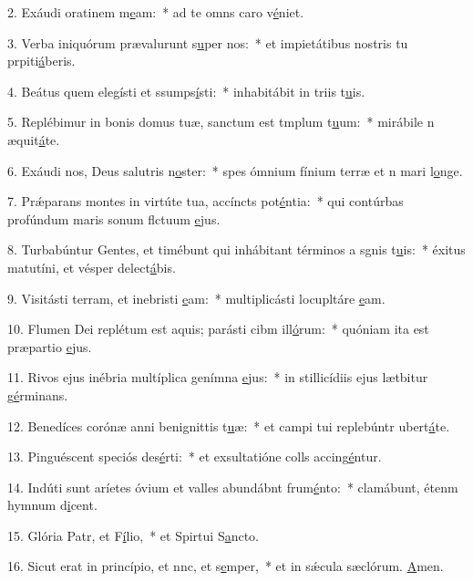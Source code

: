 2. Exáudi oratinem m\uline{e}am:~* ad te omns caro v\uline{é}niet.\par 
3. Verba iniquórum prævalurunt s\uline{u}per nos:~* et impietátibus nostris tu prpiti\uline{á}beris.\par 
4. Beátus quem elegísti et ssumps\uline{í}sti:~* inhabitábit in triis t\uline{u}is.\par 
5. Replébimur in bonis domus tuæ, sanctum est tmplum t\uline{u}um:~* mirábile n æquit\uline{á}te.\par 
6. Exáudi nos, Deus salutris n\uline{o}ster:~* spes ómnium fínium terræ et n mari l\uline{o}nge.\par 
7. Prǽparans montes in virtúte tua, accíncts pot\uline{é}ntia:~* qui contúrbas profúndum maris sonum flctuum \uline{e}jus.\par 
8. Turbabúntur Gentes, et timébunt qui inhábitant términos a sgnis t\uline{u}is:~* éxitus matutíni, et vésper delect\uline{á}bis.\par 
9. Visitásti terram, et inebristi \uline{e}am:~* multiplicásti locupltáre \uline{e}am.\par 
10. Flumen Dei replétum est aquis; parásti cibm ill\uline{ó}rum:~* quóniam ita est præpartio \uline{e}jus.\par 
11. Rivos ejus inébria multíplica genímna \uline{e}jus:~* in stillicídiis ejus lætbitur g\uline{é}rminans.\par 
12. Benedíces corónæ anni benignittis t\uline{u}æ:~* et campi tui replebúntr ubert\uline{á}te.\par 
13. Pinguéscent speciós des\uline{é}rti:~* et exsultatióne colls accing\uline{é}ntur.\par 
14. Indúti sunt aríetes óvium et valles abundábnt frum\uline{é}nto:~* clamábunt, étenm hymnum d\uline{i}cent.\par 
15. Glória Patr, et F\uline{í}lio,~* et Spirtui S\uline{a}ncto.\par 
16. Sicut erat in princípio, et nnc, et s\uline{e}mper,~* et in sǽcula sæclórum. \uline{A}men.\par 
